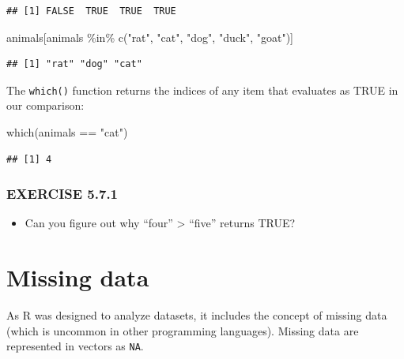 \documentclass[
]{book}
\newenvironment{Shaded}{\begin{snugshade}}{\end{snugshade}}
\newcommand{\FunctionTok}[1]{\textcolor[rgb]{0.00,0.00,0.00}{#1}}
\newcommand{\NormalTok}[1]{#1}
\newcommand{\SpecialCharTok}[1]{\textcolor[rgb]{0.00,0.00,0.00}{#1}}
\newcommand{\StringTok}[1]{\textcolor[rgb]{0.31,0.60,0.02}{#1}}
\providecommand{\tightlist}{%
  \setlength{\itemsep}{0pt}\setlength{\parskip}{0pt}}
\begin{document}
\begin{verbatim}
## [1] FALSE  TRUE  TRUE  TRUE
\end{verbatim}

\begin{Shaded}
\begin{Highlighting}[]
\NormalTok{animals[animals }\SpecialCharTok{\%in\%} \FunctionTok{c}\NormalTok{(}\StringTok{"rat"}\NormalTok{, }\StringTok{"cat"}\NormalTok{, }\StringTok{"dog"}\NormalTok{, }\StringTok{"duck"}\NormalTok{, }\StringTok{"goat"}\NormalTok{)]}
\end{Highlighting}
\end{Shaded}

\begin{verbatim}
## [1] "rat" "dog" "cat"
\end{verbatim}

The \texttt{which()} function returns the indices of any item that evaluates as TRUE in our comparison:

\begin{Shaded}
\begin{Highlighting}[]
\FunctionTok{which}\NormalTok{(animals }\SpecialCharTok{==} \StringTok{"cat"}\NormalTok{)}
\end{Highlighting}
\end{Shaded}

\begin{verbatim}
## [1] 4
\end{verbatim}

\hypertarget{exercise-5.7.1}{%
\subsubsection*{EXERCISE 5.7.1}\label{exercise-5.7.1}}

\begin{itemize}
\tightlist
\item
  Can you figure out why ``four'' \textgreater{} ``five'' returns TRUE?
\end{itemize}

\hypertarget{missing-data}{%
\section{Missing data}\label{missing-data}}

As R was designed to analyze datasets, it includes the concept of missing data (which is uncommon in other programming languages). Missing data are represented in vectors as \texttt{NA}.
\end{document}
